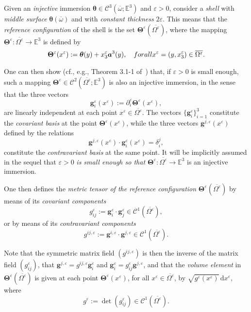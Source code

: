 \documentclass{amsart}
\def\dd{\, \mathrm{d}}
\begin{document}
Given an \emph{injective} immersion $\bm{\theta} \in \mathcal{C}^3(\overline{\omega}; \mathbb{E}^3)$ and $\varepsilon > 0$, consider a \emph{shell} with \emph{middle surface} $\bm{\theta} (\overline{\omega})$ and with \emph{constant thickness} $2 \varepsilon$. This means that the \emph{reference configuration} of the shell is the set $\bm{\Theta}^\varepsilon(\overline{\Omega^\varepsilon})$, where the mapping $\bm{\Theta}^\varepsilon:\overline{\Omega^\varepsilon} \to \mathbb{E}^3$ is defined by
$$
\bm{\Theta}^\varepsilon(x^\varepsilon) := \bm{\theta}(y) + x^\varepsilon_3 \bm{a}^3(y), \quad \textup{ for all } x^\varepsilon = (y,x^\varepsilon_3) \in \overline{\Omega^\varepsilon}.
$$

One can then show (cf., e.g., Theorem 3.1-1 of~\cite{Ciarlet2000}) that, if $\varepsilon > 0$ is small enough, such a mapping $\bm{\Theta}^\varepsilon \in \mathcal{C}^2(\overline{\Omega^\varepsilon}; \mathbb{E}^3)$ is also an injective immersion, in the sense that the three vectors
$$
\bm{g}^\varepsilon_i(x^\varepsilon) := \partial^\varepsilon_i \bm{\Theta}^\varepsilon(x^\varepsilon),
$$
are linearly independent at each point $x^\varepsilon \in \overline{\Omega^\varepsilon}$. The vectors $\{\bm{g}^\varepsilon_i\}_{i=1}^3$ constitute the \emph{covariant basis} at the point $\bm{\Theta}^\varepsilon(x^\varepsilon)$, while the three vectors $\bm{g}^{j,\varepsilon}(x^\varepsilon)$ defined by the relations
$$
\bm{g}^{j,\varepsilon}(x^\varepsilon) \cdot \bm{g}^\varepsilon_i(x^\varepsilon) = \delta^j_i,
$$
constitute the \emph{contravariant basis} at the same point. It will be implicitly assumed in the sequel that $\varepsilon > 0$ \emph{is small enough so that $\bm{\Theta}^\varepsilon:\overline{\Omega^\varepsilon} \to \mathbb{E}^3$} is an injective immersion.

One then defines the \emph{metric tensor of the reference configuration} $\bm{\Theta}^\varepsilon(\overline{\Omega^\varepsilon})$ by means of its \emph{covariant components}
$$
g^\varepsilon_{ij} := \bm{g}^\varepsilon_i \cdot \bm{g}^\varepsilon_j \in \mathcal{C}^1(\overline{\Omega^\varepsilon}),
$$
or by means of its \emph{contravariant components}
$$
g^{ij,\varepsilon} := \bm{g}^{i,\varepsilon} \cdot \bm{g}^{j,\varepsilon} \in \mathcal{C}^1(\overline{\Omega^\varepsilon}).
$$

Note that the symmetric matrix field $(g^{ij,\varepsilon})$ is then the inverse of the matrix field $(g^\varepsilon_{ij})$, that $\bm{g}^{j,\varepsilon} = g^{ij,\varepsilon} \bm{g}^\varepsilon_i$ and $\bm{g}^\varepsilon_i = g^\varepsilon_{ij} \bm{g}^{j,\varepsilon}$, and that the \emph{volume element} in $\bm{\Theta}^\varepsilon(\overline{\Omega^\varepsilon})$ is given at each point $\bm{\Theta}^\varepsilon(x^\varepsilon)$, for all $x^\varepsilon \in \overline{\Omega^\varepsilon}$, by $\sqrt{g^\varepsilon (x^\varepsilon)} \dd x^\varepsilon$, where
$$
g^\varepsilon := \det (g^\varepsilon_{ij}) \in \mathcal{C}^1(\overline{\Omega^\varepsilon}).
$$
\end{document}
